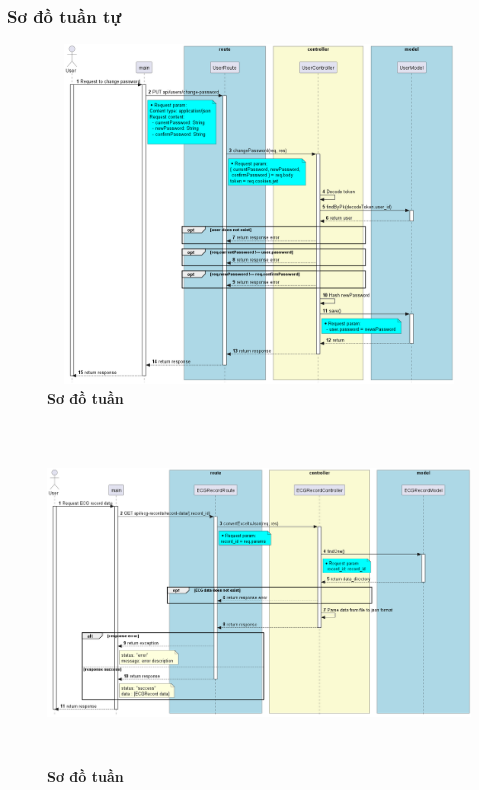 \documentclass{article}%
\begin{document}
\subsubsection{Sơ đồ tuần tự}

\begin{figure}[H]
  \centering
  \includegraphics[width=16cm,height=9cm]{Images/server/sequence/server/changePassword.png}
  \caption[Sơ đồ tuần tự ]{\bfseries \fontsize{12pt}{0pt}
  \selectfont Sơ đồ tuần }
  \label{hinh21} %
\end{figure}


\begin{figure}[H]
  \centering
  \includegraphics[width=16cm,height=9cm]{Images/server/sequence/server/convertExceltoJson.png}
  \caption[Sơ đồ tuần tự ]{\bfseries \fontsize{12pt}{0pt}
  \selectfont Sơ đồ tuần }
  \label{hinh21} %
\end{figure}
\end{document}
